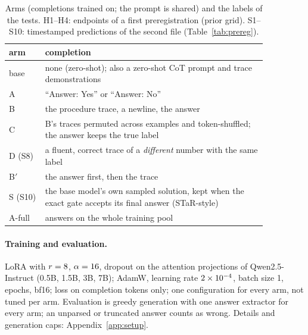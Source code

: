 \documentclass{article}
\theoremstyle{definition}
\begin{document}
\begin{table}[t]
\caption{Arms (completions trained on; the prompt is shared) and the labels of the tests. H1--H4: endpoints of a first preregistration (prior grid). S1--S10: timestamped predictions of the second file (Table~\ref{tab:prereg}).}
\label{tab:arms}
\centering\footnotesize\setlength{\tabcolsep}{4pt}
\begin{tabular}{@{}lp{0.86\linewidth}@{}}
\toprule
arm & completion \\
\midrule
base & none (zero-shot); also a zero-shot CoT prompt and \nShots{} trace demonstrations \\
A & ``Answer: Yes'' or ``Answer: No'' \\
B & the procedure trace, a newline, the answer \\
C & B's traces permuted across examples and token-shuffled; the answer keeps the true label \\
D (S8) & a fluent, correct trace of a \emph{different} number with the same label \\
B$'$ & the answer first, then the trace \\
S (S10) & the base model's own sampled solution, kept when the exact gate accepts its final answer (STaR-style) \\
A-full & answers on the whole training pool \\
\bottomrule
\end{tabular}
\end{table}

\paragraph{Training and evaluation.} LoRA \citep{hu2022lora} with $r=8$, $\alpha=16$, dropout \loraDropout{} on the attention projections of Qwen2.5-Instruct \citep{qwen2024qwen25} (0.5B, 1.5B, 3B, 7B); AdamW, learning rate $2\times 10^{-4}$, batch size 1, \nEpochs{} epochs, bf16; loss on completion tokens only; one configuration for every arm, not tuned per arm. Evaluation is greedy generation with one answer extractor for every arm; an unparsed or truncated answer counts as wrong. Details and generation caps: Appendix~\ref{app:setup}.
\end{document}
